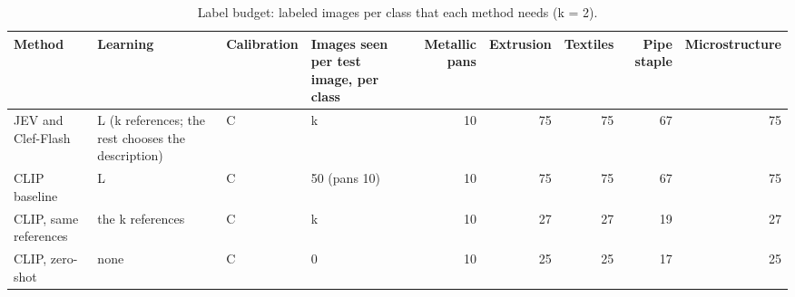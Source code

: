 \begin{table}

\caption{\label{tab:tbl-budget}Label budget: labeled images per class that each method needs (k = 2).}
\centering
\begin{tabular}[t]{llllrrrrr}
\toprule
Method & Learning & Calibration & Images seen per test image, per class & Metallic pans & Extrusion & Textiles & Pipe staple & Microstructure\\
\midrule
JEV and Clef-Flash & L (k references; the rest chooses the description) & C & k & 10 & 75 & 75 & 67 & 75\\
CLIP baseline & L & C & 50 (pans 10) & 10 & 75 & 75 & 67 & 75\\
CLIP, same references & the k references & C & k & 10 & 27 & 27 & 19 & 27\\
CLIP, zero-shot & none & C & 0 & 10 & 25 & 25 & 17 & 25\\
\bottomrule
\end{tabular}
\end{table}
